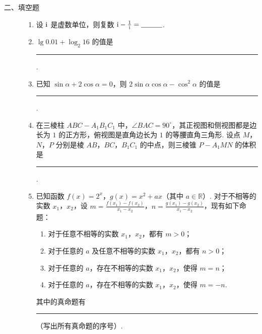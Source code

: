 \begin{description}

    \item[二、填空题]

    \begin{enumerate}[leftmargin=5pt]

      \addtocounter{enumi}{+10}

        \item 设 \(\mathrm{i}\) 是虚数单位，则复数 \(\i - \frac{1}{\i} =\rule[-0.3ex]{3em}{0.4pt}\).

        \item \(\lg 0.01 + \log_2 16\) 的值是\rule[-0.3ex]{3em}{0.4pt}.

        \item 已知 \(\sin \alpha + 2\cos \alpha = 0\)，则 \(2\sin \alpha \cos \alpha - \cos^2 \alpha\) 的值是\rule[-0.3ex]{3em}{0.4pt}.

        \item 在三棱柱 \(ABC - A_{1}B_{1}C_{1}\) 中，\(\angle BAC = 90^{\circ}\)，其正视图和侧视图都是边长为 \(1\) 的正方形，俯视图是直角边长为 \(1\) 的等腰直角三角形. 设点 \(M\)，\(N\)，\(P\) 分别是棱 \(AB\)，\(BC\)，\(B_{1}C_{1}\) 的中点，则三棱锥 \(P - A_{1}MN\) 的体积是\rule[-0.3ex]{3em}{0.4pt}.

        \item 已知函数 \(f(x) = 2^x\)，\(g(x) = x^2 + ax\)（其中 \(a \in \mathbb{R}\)）. 对于不相等的实数 \(x_1\)，\(x_2\)，设 \(m = \frac{f(x_1) - f(x_2)}{x_1 - x_2}\)，\(n = \frac{g(x_1) - g(x_2)}{x_1 - x_2}\)，现有如下命题：

\begin{enumerate}
\item 对于任意不相等的实数 \(x_1\)，\(x_2\)，都有 \(m > 0\)；
\item 对于任意的 \(a\) 及任意不相等的实数 \(x_1\)，\(x_2\)，都有 \(n > 0\)；
\item 对于任意的 \(a\)，存在不相等的实数 \(x_1\)，\(x_2\)，使得 \(m = n\)；
\item 对于任意的 \(a\)，存在不相等的实数 \(x_1\)，\(x_2\)，使得 \(m = -n\).
\end{enumerate}

其中的真命题有\rule[-0.3ex]{3em}{0.4pt}（写出所有真命题的序号）.

    \end{enumerate}

\end{description}


